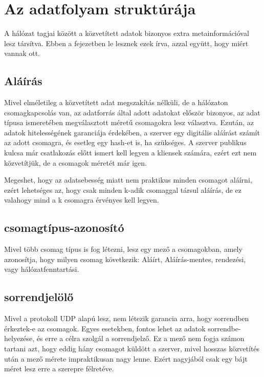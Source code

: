 \chapter{Az adatfolyam struktúrája}

A hálózat tagjai között a közvetített adatok bizonyos extra
metainformációval lesz társítva. Ebben a fejezetben le lesznek ezek írva,
azzal együtt, hogy miért vannak ott.

\section{Aláírás}

Mivel elméletileg a közvetített adat megszakítás nélküli, de a hálózaton
csomagkapcsolás van, az adatforrás által adott adatokat először bizonyos,
az adat típusa ismeretében megválasztott méretű csomagokra lesz választva.
Ezután, az adatok hitelességének garanciája érdekében, a szerver egy
digitális aláírást számít az adott csomagra, és esetleg egy hash-et is,
ha szükséges. A szerver publikus kulcsa már csatlakozás előtt ismert kell
legyen a kliensek számára, ezért ezt nem közvetítjük, de a csomagok
méretét már igen.

Megeshet, hogy az adatsebesség miatt nem praktikus minden csomagot
aláírni, ezért lehetséges az, hogy csak minden k-adik csomaggal társul
aláírás, de ez valahogy mind a k csomagra érvényes kell legyen.

\section{csomagtípus-azonosító}

Mivel több csomag típus is fog létezni, lesz egy mező a csomagokban,
amely azonosítja, hogy milyen csomag következik: Aláírt, Aláírás-mentes,
rendezési, vagy hálózatfenntartási.

\section{sorrendjelölő}

Mivel a protokoll UDP alapú lesz, nem létezik garancia arra, hogy
sorrendben érkeztek-e az csomagok. Egyes esetekben, fontos lehet az
adatok sorrendbe-helyezése, és erre a célra szolgál a sorrendjelző. 
Ez a mező nem fogja számon tartani azt, hogy eddig hány csomagot küldött
a szerver, mivel hosszas közvetítés után a mező mérete impraktikusan nagy
lenne. Ezért nagyjából csak egy bájt méret lesz erre a szerepre
félretéve.

